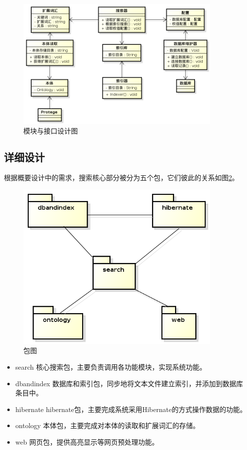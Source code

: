 \documentclass[12pt,a4paper]{article}
\begin{document}
	\begin{figure}[htbp] 
	\centering\includegraphics[width=4in]{fig/moduleInterface.png} 
	\caption{模块与接口设计图}\label{fig:模块与接口设计图}
	\end{figure}
	
	\subsection{详细设计}	
	根据概要设计中的需求，搜索核心部分被分为五个包，它们彼此的关系如图\ref{fig:包图}。
	\begin{figure}[htbp] 
	\centering\includegraphics[width=4in]{fig/Package.png} 
	\caption{包图}\label{fig:包图}
	\end{figure}
	
	\begin{itemize}
	\item search
	核心搜索包，主要负责调用各功能模块，实现系统功能。
	\item dbandindex
	数据库和索引包，同步地将文本文件建立索引，并添加到数据库条目中。
	\item hibernate
	hibernate包，主要完成系统采用Hibernate的方式操作数据的功能。
	\item ontology
	本体包，主要完成对本体的读取和扩展词汇的存储。
	\item web
	网页包，提供高亮显示等网页预处理功能。	
	\end{itemize}
	
\end{document}
